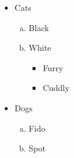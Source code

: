 \documentclass{article}
\begin{document}
\begin{itemize}[\textbullet]   %
  \item Cats
    \begin{enumerate}[(a)]     %
      \item Black
      \item White
        \begin{itemize}[--]    %
          \item Furry
          \item Cuddly
        \end{itemize}          %
    \end{enumerate}            %
  \item Dogs                   %
    \begin{enumerate}[(a)]     %
      \item Fido
      \item Spot
    \end{enumerate}            %
\end{itemize}                  %
\end{document}
